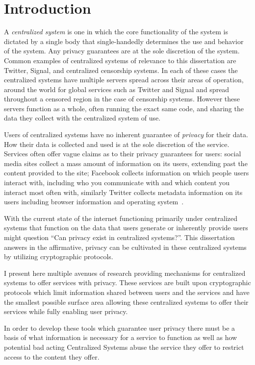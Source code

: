 \chapter{Introduction}

A \emph{centralized system} is one in which the core functionality of the system
is dictated by a single body that single-handedly determines the use and
behavior of the system. Any privacy guarantees are at the sole discretion of the
system. Common examples of centralized systems of relevance to this dissertation
are Twitter, Signal, and centralized censorship systems. In each of these cases
the centralized systems have multiple servers spread across their areas of
operation, around the world for global services such as Twitter and Signal and
spread throughout a censored region in the case of censorship systems. However
these servers function as a whole, often running the exact same code, and
sharing the data they collect with the centralized system of use.

Users of centralized systems have no inherent guarantee of \emph{privacy} for
their data. How their data is collected and used is at the sole discretion of
the service. Services often offer vague claims as to their privacy guarantees
for users: social media sites collect a mass amount of information on its users,
extending past the content provided to the site; Facebook collects information
on which people users interact with, including who you communicate with and
which content you interact most often with, similarly Twitter collects metadata
information on its users including browser information and operating
system~\cite{fb-privacy,twitter-privacy}.

With the current state of the internet functioning primarily under centralized
systems that function on the data that users generate or inherently provide
users might question ``Can privacy exist in centralized systems?''. This
dissertation answers in the affirmative, privacy can be cultivated in these
centralized systems by utilizing cryptographic protocols.

I present here multiple avenues of research providing mechanisms for centralized
systems to offer services with privacy. These services are built upon
cryptographic protocols which limit information shared between users and the
services and have the smallest possible surface area allowing these centralized
systems to offer their services while fully enabling user privacy.

In order to develop these tools which guarantee user privacy there must be a
basis of what information is necessary for a service to function as well as how
potential bad acting Centralized Systems abuse the service they offer to
restrict access to the content they offer.

